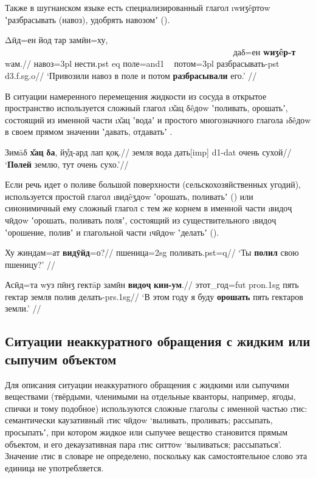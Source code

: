 Также в шугнанском языке есть специализированный глагол \i{wиӡêртоw} ʽразбрасывать (навоз), удобрять навозомʼ \parencite[353]{karamshoev1988} ().

\begingl
\gla Δӣд=ен йод тар замӣн=ху, ~~~~~~~~~~~~~~~~~~~~~~~~~~~~~~~~~~~~~~~~~~~~~~~~~~~~~ даδ=ен \textbf{wиӡêр-т} wам.//
\glc навоз={\sc 3pl} нести.{\sc pst} {\sc eq} поле={\sc and1} ~ потом={\sc 3pl} разбрасывать-{\sc pst} {\sc d3.f.sg.o}//
\glft ‘Привозили навоз в поле и потом \textbf{разбрасывали} его.’ //
\endgl \xe

В ситуации намеренного перемещения жидкости из сосуда в открытое пространство используется сложный глагол \i{х̌ац δêдоw} ʽполивать, орошатьʼ, состоящий из именной части \i{х̌ац} ʽводаʼ и простого многозначного глагола \i{δêдоw} в своем прямом значении ʽдавать, отдаватьʼ \parencite{karamshoev1999}.

\begingl
\gla Зимāδ \textbf{х̌ац} \textbf{δа}, йу̊д-ард лап қоқ.//
\glc земля вода дать[{\sc imp}] {\sc d1-dat} очень сухой//
\glft ‘\textbf{Полей} землю, тут очень сухо.’//
\endgl \xe

Если речь идет о поливе большой поверхности (сельскохозяйственных угодий), используется простой глагол \i{видêӡдоw} ʽорошать, поливатьʼ \parencite[303]{karamshoev1988} () или синонимичный ему сложный глагол с тем же корнем в именной части \i{видоҷ чӣдоw} ʽорошать, поливать поляʼ, состоящий из существительного \i{видоҷ} ʽорошение, поливʼ и глагольной части \i{чӣдоw} ʽделатьʼ ().

\begingl
\gla Ху жиндам=ат \textbf{видӯйд}=о?//
 пшеница={\sc 2sg} поливать.{\sc pst=q}//
\glft ‘Ты \textbf{полил} свою пшеницу?’ //
\endgl \xe

\begingl
\gla Асӣд=та wуз пӣнӡ гектāр замӣн \textbf{видоҷ} \textbf{кин-ум}.//
\glc этот\_год={\sc fut} {\sc pron.1sg} пять гектар земля полив делать-{\sc prs.1sg}//
\glft ‘В этом году я буду \textbf{орошать} пять гектаров земли.’ //
\endgl \xe

\subsection{Ситуации неаккуратного обращения с жидким или сыпучим объектом} \label{pour-22}

Для описания ситуации неаккуратного обращения с жидкими или сыпучими веществами (твёрдыми, членимыми на отдельные кванторы, например, ягоды, спички и тому подобное) используются сложные глаголы с именной частью \i{тис}: семантически каузативный \i{тис чӣдоw} ‘выливать, проливать; рассыпать, просыпатьʼ, при котором жидкое или сыпучее вещество становится прямым объектом, и его декаузативная пара \i{тис ситтоw} ‘выливаться; рассыпаться’. Значение \i{тис} в словаре не определено, поскольку как самостоятельное слово эта единица не употребляется.

